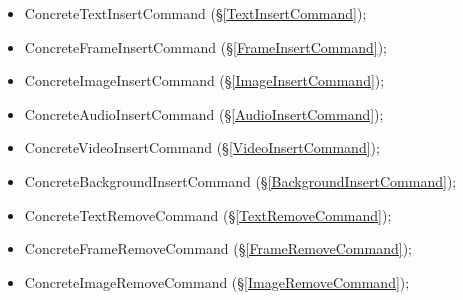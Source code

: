 {{{		
		\begin{itemize}
			\item ConcreteTextInsertCommand (\S\ref{TextInsertCommand});
			\item ConcreteFrameInsertCommand (\S\ref{FrameInsertCommand});
			\item ConcreteImageInsertCommand (\S\ref{ImageInsertCommand});
			\item ConcreteAudioInsertCommand (\S\ref{AudioInsertCommand});
			\item ConcreteVideoInsertCommand (\S\ref{VideoInsertCommand});
			\item ConcreteBackgroundInsertCommand (\S\ref{BackgroundInsertCommand});
			\item ConcreteTextRemoveCommand (\S\ref{TextRemoveCommand});
			\item ConcreteFrameRemoveCommand (\S\ref{FrameRemoveCommand});
			\item ConcreteImageRemoveCommand (\S\ref{ImageRemoveCommand});


\end{itemize}}}}
